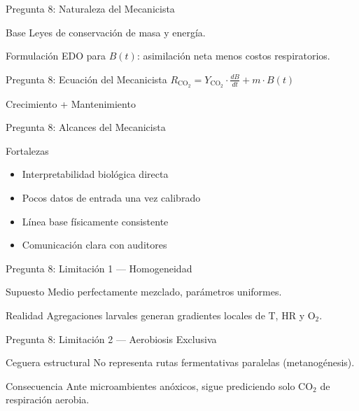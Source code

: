 \documentclass[aspectratio=169, 11pt]{beamer}
\begin{document}
\begin{frame}{Pregunta 8: Naturaleza del Mecanicista}
\begin{block}{Base}
\footnotesize
Leyes de conservación de masa y energía.
\end{block}
\begin{exampleblock}{Formulación}
\footnotesize
EDO para $B(t)$: asimilación neta menos costos respiratorios.
\end{exampleblock}
\end{frame}

\begin{frame}{Pregunta 8: Ecuación del Mecanicista}
\centering
\Large
$R_{\text{CO}_2} = Y_{\text{CO}_2} \cdot \frac{dB}{dt} + m \cdot B(t)$
\vspace{0.3cm}

\footnotesize
Crecimiento + Mantenimiento
\end{frame}

\begin{frame}{Pregunta 8: Alcances del Mecanicista}
\begin{exampleblock}{Fortalezas}
\footnotesize
\begin{itemize}
    \item Interpretabilidad biológica directa
    \item Pocos datos de entrada una vez calibrado
    \item Línea base físicamente consistente
    \item Comunicación clara con auditores
\end{itemize}
\end{exampleblock}
\end{frame}

\begin{frame}{Pregunta 8: Limitación 1 --- Homogeneidad}
\begin{alertblock}{Supuesto}
\footnotesize
Medio perfectamente mezclado, parámetros uniformes.
\end{alertblock}
\begin{block}{Realidad}
\footnotesize
Agregaciones larvales generan gradientes locales de T, HR y O$_2$.
\end{block}
\end{frame}

\begin{frame}{Pregunta 8: Limitación 2 --- Aerobiosis Exclusiva}
\begin{alertblock}{Ceguera estructural}
\footnotesize
No representa rutas fermentativas paralelas (metanogénesis).
\end{alertblock}
\begin{block}{Consecuencia}
\footnotesize
Ante microambientes anóxicos, sigue prediciendo solo CO$_2$ de respiración aerobia.
\end{block}
\end{frame}
\end{document}
